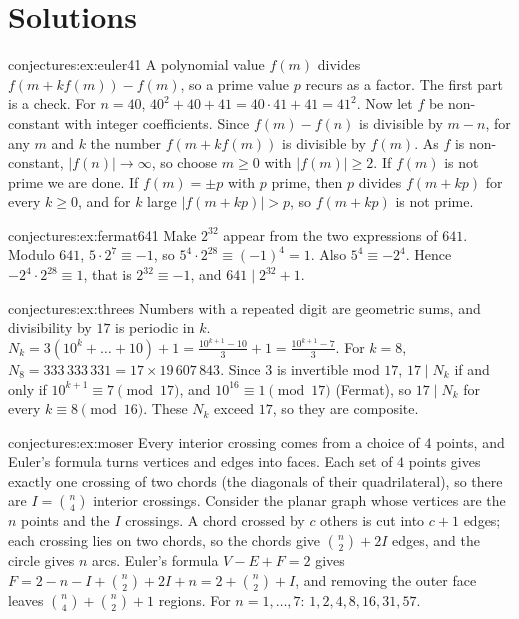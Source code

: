 \section{Solutions}

\begin{solution}{conjectures:ex:euler41}
\idea A polynomial value $f(m)$ divides $f(m+kf(m))-f(m)$, so a prime value $p$ recurs as a factor.
\writeup The first part is a check. For $n=40$, $40^2+40+41=40\cdot41+41=41^2$. Now let $f$ be non-constant with integer coefficients.
Since $f(m)-f(n)$ is divisible by $m-n$, for any $m$ and $k$ the number $f(m+kf(m))$ is divisible by $f(m)$. As $f$ is non-constant, $|f(n)|\to\infty$, so choose
$m\ge0$ with $|f(m)|\ge2$. If $f(m)$ is not prime we are done. If $f(m)=\pm p$ with $p$ prime, then $p$ divides $f(m+kp)$ for every $k\ge0$, and for $k$ large
$|f(m+kp)|>p$, so $f(m+kp)$ is not prime.
\end{solution}

\begin{solution}{conjectures:ex:fermat641}
\idea Make $2^{32}$ appear from the two expressions of $641$.
\writeup Modulo $641$, $5\cdot2^7\equiv-1$, so $5^4\cdot2^{28}\equiv(-1)^4=1$. Also $5^4\equiv-2^4$. Hence $-2^4\cdot2^{28}\equiv1$, that is $2^{32}\equiv-1$, and
$641\mid2^{32}+1$.
\end{solution}

\begin{solution}{conjectures:ex:threes}
\idea Numbers with a repeated digit are geometric sums, and divisibility by $17$ is periodic in $k$.
\writeup $N_k=3(10^k+\dots+10)+1=\frac{10^{k+1}-10}3+1=\frac{10^{k+1}-7}3$. For $k=8$, $N_8=333\,333\,331=17\times19\,607\,843$. Since $3$ is invertible mod $17$, $17\mid N_k$
if and only if $10^{k+1}\equiv7\pmod{17}$, and $10^{16}\equiv1\pmod{17}$ (Fermat), so $17\mid N_k$ for every $k\equiv8\pmod{16}$. These $N_k$ exceed $17$, so they are
composite.
\end{solution}

\begin{solution}{conjectures:ex:moser}
\idea Every interior crossing comes from a choice of $4$ points, and Euler's formula turns vertices and edges into faces.
\writeup Each set of $4$ points gives exactly one crossing of two chords (the diagonals of their quadrilateral), so there are $I=\binom n4$ interior crossings.
Consider the planar graph whose vertices are the $n$ points and the $I$ crossings. A chord crossed by $c$ others is cut into $c+1$ edges; each crossing lies
on two chords, so the chords give $\binom n2+2I$ edges, and the circle gives $n$ arcs. Euler's formula $V-E+F=2$ gives
$F=2-n-I+\binom n2+2I+n=2+\binom n2+I$, and removing the outer face leaves $\binom n4+\binom n2+1$ regions. For $n=1,\dots,7$: $1,2,4,8,16,31,57$.
\end{solution}

